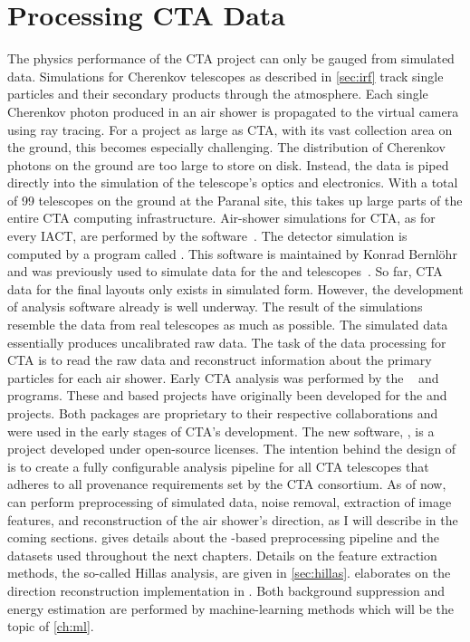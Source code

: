 \chapter{Processing CTA Data }
\label{ch:cta_analysis}

The physics performance of the CTA project can only be gauged from simulated data. 
Simulations for Cherenkov telescopes as described in \cref{sec:irf} 
track single particles and their secondary products through the atmosphere. Each single Cherenkov photon produced in an air shower 
is propagated to the virtual camera using ray tracing.
For a project as large as CTA, with its vast collection area on the ground, this becomes especially challenging. 
The distribution of Cherenkov photons on the ground are too large to store on disk. Instead, the data is piped directly into the
simulation of the telescope's optics and electronics. With a total of 99 telescopes on the ground at the Paranal site, this takes up large 
parts of the entire CTA computing infrastructure. 
Air-shower simulations for CTA, as for every IACT, are performed by the \corsika software~\cite{corsika}. The detector simulation is computed
by a program called \simtel. This software is maintained by Konrad Bernlöhr and was previously used to simulate 
data for the \hegra and \hess telescopes~\cite{simtel}.
So far, CTA data for the final layouts only exists in simulated form. However, the development of analysis software already is well underway.
The result of the simulations resemble the data from real telescopes as much as possible. The simulated data essentially produces 
uncalibrated raw data. The task of the data processing for CTA is to read the raw data and reconstruct 
information about the primary particles for each air shower.  
Early CTA analysis was performed by the \eventdisplay~\cite{eventdisplay} and \mars~\cite{magic_mars} programs.
These \rootcern and \cpp based projects have originally been developed for the \veritas and \magic 
projects. Both packages are proprietary to their respective collaborations and were used in the early stages of CTA's development.
The new software, \ctapipe, is a \python project developed under open-source licenses. 
The intention behind the design of \ctapipe is to create a fully configurable analysis pipeline for all CTA telescopes that adheres to all 
provenance requirements set by the CTA consortium. 
As of now, \ctapipe can perform preprocessing of simulated data, noise removal, extraction of image features, 
and reconstruction of the air shower's direction, as I will describe in the coming sections. 
 gives details about the \ctapipe-based preprocessing pipeline and the datasets used throughout the next chapters.
Details on the feature extraction methods, the so-called Hillas analysis, are given in \cref{sec:hillas}.
 elaborates on the direction reconstruction implementation in \ctapipe.
Both background suppression and energy estimation are performed by machine-learning methods which will be the topic of \cref{ch:ml}.


